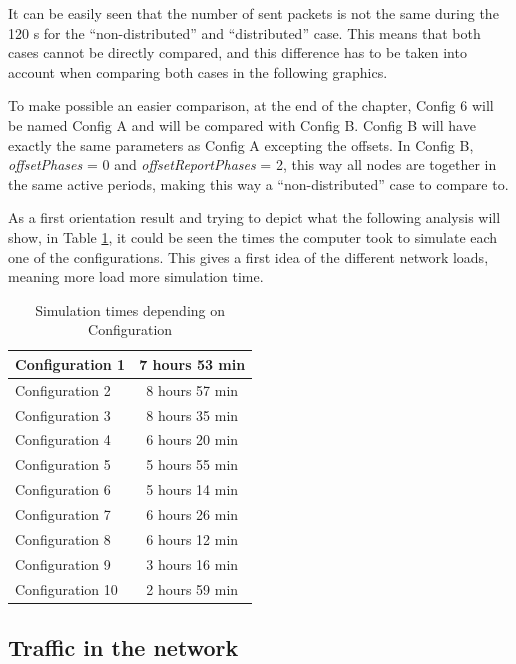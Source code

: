 It can be easily seen that the number of sent packets is not the same during the 120 s for the ``non-distributed'' and ``distributed'' case. This 
means that both cases cannot be directly compared, and this difference has to be taken into account when comparing both cases in the following 
graphics.

To make possible an easier 
comparison, at the end of the chapter, Config 6 will be named Config A and will be compared with Config B. Config B will have exactly the same
parameters as Config A excepting the offsets. In Config B, \textit{offsetPhases} = 0 and \textit{offsetReportPhases} = 2, this way all nodes are
together in the same active periods, making this way a ``non-distributed'' case to compare to.


As a first orientation result and trying to depict what the following analysis will show, in Table \ref{tab:simulationtimes}, it could be seen the times 
the computer took to simulate each one of the configurations. This gives a first idea of the different network loads, meaning more load more simulation
time.

\begin{table}
 \begin{center}
  \begin{tabular}{|l|c|}
   \hline
   Configuration 1 & 7 hours 53 min \\
   \hline
   Configuration 2 & 8 hours 57 min \\
   \hline
   Configuration 3 & 8 hours 35 min \\
   \hline
   Configuration 4 & 6 hours 20 min \\
   \hline
   Configuration 5 & 5 hours 55 min \\
   \hline
   Configuration 6 & 5 hours 14 min \\
   \hline
   Configuration 7 & 6 hours 26 min \\
   \hline
   Configuration 8 & 6 hours 12 min \\
   \hline
   Configuration 9 & 3 hours 16 min \\
   \hline
   Configuration 10 & 2 hours 59 min \\
   \hline
  \end{tabular}
  \caption{Simulation times depending on Configuration}
  \label{tab:simulationtimes}
 \end{center}
\end{table}

\subsection{Traffic in the network}

